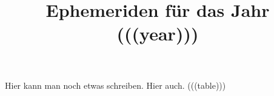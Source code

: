 \documentclass[a4paper, twoside]{book}
\title{Ephemeriden für das Jahr (((year)))}
\begin{document}
\sffamily
\maketitle
Hier kann man noch etwas schreiben.
\newpage
Hier auch.
\newpage
(((table)))
\end{document}
